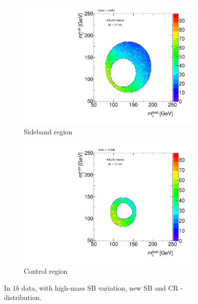 \begin{figure}[htbp!]
\centering
\captionsetup{justification=centering}
    \begin{subfigure}[b]{0.45\textwidth}
        \includegraphics[width=\textwidth,angle=-90]{figures/boosted/Syst_CRSB/SB_High_Sideband_OneTag_mH0H1.pdf}
        \caption{Sideband region}
        \label{CRSB:SB_High_SB}
    \end{subfigure}
    \quad
    \begin{subfigure}[b]{0.45\textwidth}
        \includegraphics[width=\textwidth,angle=-90]{figures/boosted/Syst_CRSB/SB_High_Control_OneTag_mH0H1.pdf}
        \caption{Control region}
        \label{CRSB:SB_High_CR}
    \end{subfigure}
\caption{In $1b$ data, with high-mass SB variation, new SB and CR \mleadJ-\msublJ distribution.}
\label{CRSB:SB_High}
\end{figure}

